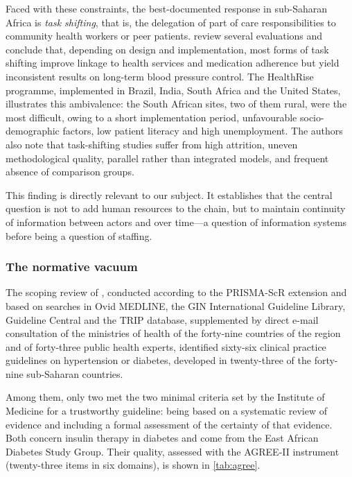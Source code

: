 \documentclass[12pt,a4paper,oneside]{report}
\begin{document}
Faced with these constraints, the best-documented response in sub-Saharan Africa is \emph{task shifting}, that is, the delegation of part of care responsibilities to community health workers or peer patients. \textcite{gafane2025} review several evaluations and conclude that, depending on design and implementation, most forms of task shifting improve linkage to health services and medication adherence but yield inconsistent results on long-term blood pressure control. The HealthRise programme, implemented in Brazil, India, South Africa and the United States, illustrates this ambivalence: the South African sites, two of them rural, were the most difficult, owing to a short implementation period, unfavourable socio-demographic factors, low patient literacy and high unemployment. The authors also note that task-shifting studies suffer from high attrition, uneven methodological quality, parallel rather than integrated models, and frequent absence of comparison groups.

This finding is directly relevant to our subject. It establishes that the central question is not to add human resources to the chain, but to maintain continuity of information between actors and over time---a question of information systems before being a question of staffing.

\subsubsection{The normative vacuum}

The scoping review of \textcite{nagavci2022}, conducted according to the PRISMA-ScR extension and based on searches in Ovid MEDLINE, the GIN International Guideline Library, Guideline Central and the TRIP database, supplemented by direct e-mail consultation of the ministries of health of the forty-nine countries of the region and of forty-three public health experts, identified sixty-six clinical practice guidelines on hypertension or diabetes, developed in twenty-three of the forty-nine sub-Saharan countries.

Among them, only two met the two minimal criteria set by the Institute of Medicine for a trustworthy guideline: being based on a systematic review of evidence and including a formal assessment of the certainty of that evidence. Both concern insulin therapy in diabetes and come from the East African Diabetes Study Group. Their quality, assessed with the AGREE-II instrument (twenty-three items in six domains), is shown in \cref{tab:agree}.
\end{document}
